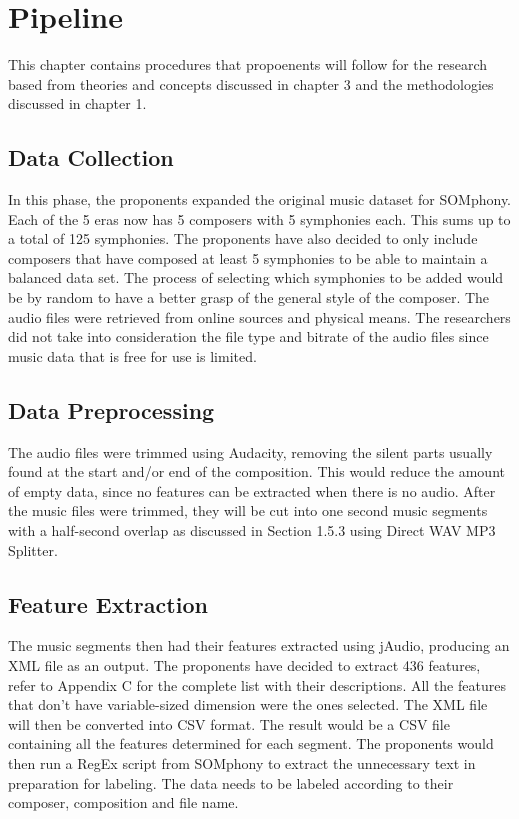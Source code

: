 %
%
%                 

\chapter{Pipeline}
This chapter contains procedures that propoenents will follow for the research based from theories and concepts discussed in chapter 3 and the methodologies discussed in chapter 1.

\section{Data Collection}

In this phase, the proponents expanded the original music dataset for SOMphony. Each of the 5 eras now has 5 composers with 5 symphonies each. This sums up to a total of 125 symphonies. The proponents have also decided to only include composers that have composed at least 5 symphonies to be able to maintain a balanced data set. The process of selecting which symphonies to be added would be by random to have a better grasp of the general style of the composer. The audio files were retrieved from online sources and physical means. The researchers did not take into consideration the file type and bitrate of the audio files since music data that is free for use is limited.

\section{Data Preprocessing}
The audio files were trimmed using Audacity, removing the silent parts usually found at the start and/or end of the composition. This would reduce the amount of empty data, since no features can be extracted when there is no audio. After the music files were trimmed, they will be cut into one second music segments with a half-second overlap as discussed in Section 1.5.3 using Direct WAV MP3 Splitter.

\section{Feature Extraction}
The music segments then had their features extracted using jAudio, producing an XML file as an output. The proponents have decided to extract 436 features, refer to Appendix C for the complete list with their descriptions. All the features that don’t have variable-sized dimension were the ones selected. The XML file will then be converted into CSV format. The result would be a CSV file containing all the features determined for each segment. The proponents would then run a RegEx script from SOMphony to extract the unnecessary text in preparation for labeling. The data needs to be labeled according to their composer, composition and file name.

